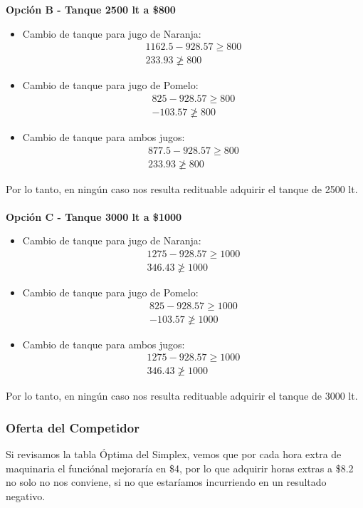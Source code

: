 \begin{homeworkProblem}[-1][Citrus]
\textbf{Opción B - Tanque 2500 lt a \$800} \\
\begin{itemize}
  \item Cambio de tanque para jugo de Naranja:
  \begin{align*}
    1162.5 - 928.57 \ge 800 \\
    233.93 \ngeq 800 
  \end{align*}
  \item Cambio de tanque para jugo de Pomelo:
  \begin{align*}
    825 - 928.57 \ge 800 \\
    - 103.57 \ngeq 800 
  \end{align*}
  \item Cambio de tanque para ambos jugos:
  \begin{align*}
    877.5 - 928.57 \ge 800 \\
    233.93 \ngeq 800 
  \end{align*}
\end{itemize}
Por lo tanto, en ningún caso nos resulta redituable adquirir el tanque de 2500 lt.\\ \\ 
\textbf{Opción C - Tanque 3000 lt a \$1000} \\
\begin{itemize}
  \item Cambio de tanque para jugo de Naranja:
  \begin{align*}
    1275 - 928.57 \ge 1000 \\
    346.43 \ngeq 1000 
  \end{align*}
  \item Cambio de tanque para jugo de Pomelo:
  \begin{align*}
    825 - 928.57 \ge 1000 \\
    - 103.57 \ngeq 1000 
  \end{align*}
  \item Cambio de tanque para ambos jugos:
  \begin{align*}
    1275 - 928.57 \ge 1000 \\
    346.43 \ngeq 1000 
  \end{align*}
\end{itemize}
Por lo tanto, en ningún caso nos resulta redituable adquirir el tanque de 3000 lt.
\subsubsection{Oferta del Competidor}
Si revisamos la tabla Óptima del Simplex, vemos que por cada hora extra de maquinaria el funciónal mejoraría en \$4, por lo que adquirir horas extras a \$8.2 no solo no nos conviene, si no que estaríamos incurriendo en un resultado negativo.
\end{homeworkProblem}